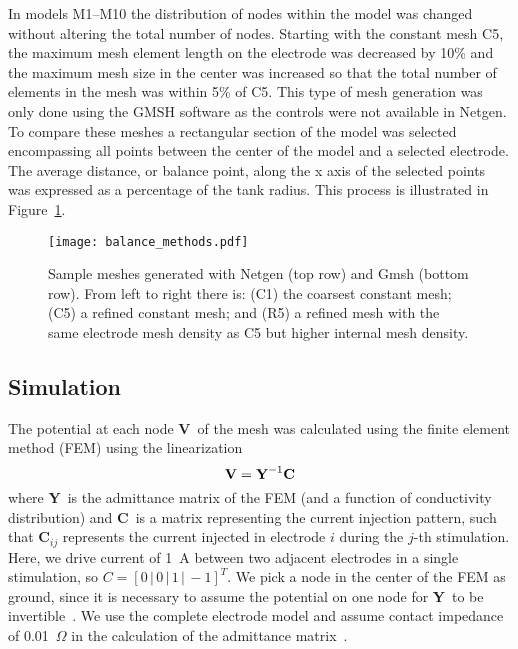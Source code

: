 \documentclass[12pt]{iopart}
\newcommand{\VB}{{\mbox{\bf V}}}
\newcommand{\YB}{{\mbox{\bf Y}}}
\newcommand{\CB}{{\mbox{\bf C}}}
\newcommand{\COMMENT}[1]{ \textsf{\color{blue}{{COMMENT: #1}}} }
\begin{document}
In models M1--M10 the distribution of nodes within the model was changed without altering 
the total number of nodes. Starting with the constant mesh C5, the maximum mesh element 
length on the electrode was decreased by 10\% and the maximum mesh size in the center was
increased so that the total number of elements in the mesh was  within 5\% of C5. This 
type of mesh generation was only done using the GMSH software as the controls were not
available in Netgen. To compare these meshes a rectangular section of the model was selected
encompassing all points between the center of the model and a selected electrode. The average 
distance, or balance point, along the x axis of the selected points was expressed 
as a percentage of the tank radius.
This process is illustrated in Figure~\ref{fig:balanceMethods}.
 
\begin{figure}
  \texttt{[image: balance\_methods.pdf]}
  \caption{\label{fig:balanceMethods} Sample meshes generated with Netgen (top row)
  and Gmsh (bottom row). From left to right there is: (C1) the coarsest constant
  mesh; (C5) a refined constant mesh; and (R5) a refined mesh with the same
  electrode mesh density as C5 but higher internal mesh density.}
\end{figure}


%
%
%

\subsection{Simulation}
The potential at each node \VB\ of the mesh was calculated using the finite
element method (FEM) using the linearization 
\begin{equation}
\VB = \YB^{-1}\CB
\end{equation}
where \YB\ is the admittance matrix of the FEM (and a function of conductivity
distribution) and \CB\ is a matrix representing the current injection pattern,
such that \CB$_{ij}$ represents the current injected in electrode $i$ during
the $j$-th stimulation. Here, we drive current of 1~A between two adjacent
electrodes in a single stimulation, so $C = [0\,|\,0\,|\,1\,|\,-1]^T$. 
We pick a node in the center of the FEM as ground, since it is necessary to
assume the potential on
one node for \YB\ to be invertible~\cite{Adler1996a}.
We use the complete electrode model and assume contact impedance of
0.01~$\Omega$ in the calculation of the admittance
matrix~\cite{Polydorides2002b}. 
\end{document}
